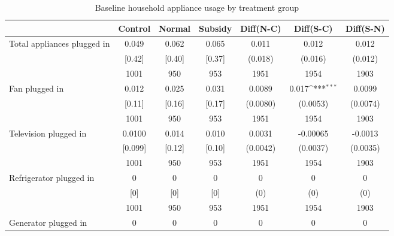 \begin{table}[htbp]\centering
\def\sym#1{\ifmmode^{#1}\else\(^{#1}\)\fi}
\caption{Baseline household appliance usage by treatment group \label{tab:"balance"}}
\begin{tabular*}{1\hsize}{@{\hskip\tabcolsep\extracolsep\fill}l*{1}{cccccc}}
\toprule
                                &  Control&   Normal&  Subsidy&Diff(N-C)         &Diff(S-C)         &Diff(S-N)         \\
\midrule
Total appliances plugged in     &    0.049&    0.062&    0.065&    0.011         &    0.012         &    0.012         \\
                                &   [0.42]&   [0.40]&   [0.37]&  (0.018)         &  (0.016)         &  (0.012)         \\
                                &     1001&      950&      953&     1951         &     1954         &     1903         \\
Fan plugged in                  &    0.012&    0.025&    0.031&   0.0089         &    0.017\sym{***}&   0.0099         \\
                                &   [0.11]&   [0.16]&   [0.17]& (0.0080)         & (0.0053)         & (0.0074)         \\
                                &     1001&      950&      953&     1951         &     1954         &     1903         \\
Television plugged in           &   0.0100&    0.014&    0.010&   0.0031         & -0.00065         &  -0.0013         \\
                                &  [0.099]&   [0.12]&   [0.10]& (0.0042)         & (0.0037)         & (0.0035)         \\
                                &     1001&      950&      953&     1951         &     1954         &     1903         \\
Refrigerator plugged in         &        0&        0&        0&        0         &        0         &        0         \\
                                &      [0]&      [0]&      [0]&      (0)         &      (0)         &      (0)         \\
                                &     1001&      950&      953&     1951         &     1954         &     1903         \\
Generator plugged in            &        0&        0&        0&        0         &        0         &        0         \\

\end{tabular*}
\end{table}
